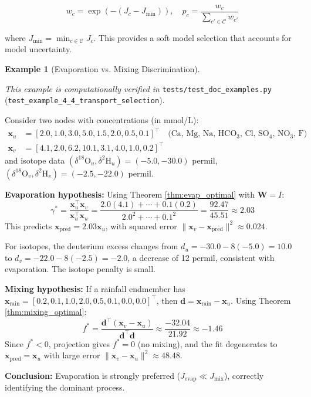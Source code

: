 \documentclass[12pt,a4paper]{article}
\theoremstyle{plain}
\theoremstyle{definition}
\newtheorem{example}[theorem]{Example}
\theoremstyle{remark}
\begin{document}
\begin{equation}\label{eq:boltzmann_weights}
	w_c = \exp(-(J_c - J_{\min})), \quad p_c = \frac{w_c}{\sum_{c' \in \mathcal{C}} w_{c'}}
\end{equation}

where $J_{\min} = \min_{c \in \mathcal{C}} J_c$. This provides a soft model selection that accounts for model uncertainty.

\begin{example}[Evaporation vs. Mixing Discrimination]\label{ex:evap_mix}

	\textit{This example is computationally verified in} \texttt{tests/test\_doc\_examples.py} (\texttt{test\_example\_4\_4\_transport\_selection}).

	Consider two nodes with concentrations (in mmol/L):
	\begin{align*}
		\mathbf{x}_u & = [2.0, 1.0, 3.0, 5.0, 1.5, 2.0, 0.5, 0.1]^\top \quad \text{(Ca, Mg, Na, HCO$_3$, Cl, SO$_4$, NO$_3$, F)} \\
		\mathbf{x}_v & = [4.1, 2.0, 6.2, 10.1, 3.1, 4.0, 1.0, 0.2]^\top
	\end{align*}
	and isotope data $(\delta^{18}\text{O}_u, \delta^2\text{H}_u) = (-5.0, -30.0)$ permil, $(\delta^{18}\text{O}_v, \delta^2\text{H}_v) = (-2.5, -22.0)$ permil.

	\textbf{Evaporation hypothesis:} Using Theorem \ref{thm:evap_optimal} with $\mathbf{W} = I$:
	\begin{equation}
		\gamma^* = \frac{\mathbf{x}_u^\top \mathbf{x}_v}{\mathbf{x}_u^\top \mathbf{x}_u} = \frac{2.0(4.1) + \cdots + 0.1(0.2)}{2.0^2 + \cdots + 0.1^2} = \frac{92.47}{45.51} \approx 2.03
	\end{equation}
	This predicts $\mathbf{x}_{\text{pred}} = 2.03 \mathbf{x}_u$, with squared error $\|\mathbf{x}_v - \mathbf{x}_{\text{pred}}\|^2 \approx 0.024$.

	For isotopes, the deuterium excess changes from $d_u = -30.0 - 8(-5.0) = 10.0$ to $d_v = -22.0 - 8(-2.5) = -2.0$, a decrease of 12 permil, consistent with evaporation. The isotope penalty is small.

	\textbf{Mixing hypothesis:} If a rainfall endmember has $\mathbf{x}_{\text{rain}} = [0.2, 0.1, 1.0, 2.0, 0.5, 0.1, 0.0, 0.0]^\top$, then $\mathbf{d} = \mathbf{x}_{\text{rain}} - \mathbf{x}_u$. Using Theorem \ref{thm:mixing_optimal}:
	\begin{equation}
		f^* = \frac{\mathbf{d}^\top (\mathbf{x}_v - \mathbf{x}_u)}{\mathbf{d}^\top \mathbf{d}} \approx \frac{-32.04}{21.92} \approx -1.46
	\end{equation}
	Since $f^* < 0$, projection gives $f^* = 0$ (no mixing), and the fit degenerates to $\mathbf{x}_{\text{pred}} = \mathbf{x}_u$ with large error $\|\mathbf{x}_v - \mathbf{x}_u\|^2 \approx 48.48$.

	\textbf{Conclusion:} Evaporation is strongly preferred ($J_{\text{evap}} \ll J_{\text{mix}}$), correctly identifying the dominant process.
\end{example}
\end{document}
